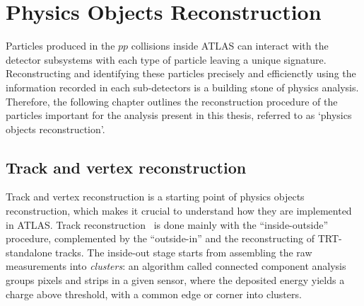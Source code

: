 \chapter{Physics Objects Reconstruction}
\large
Particles produced in the $pp$ collisions inside ATLAS can interact with the detector subsystems
with each type of particle leaving a unique signature.
Reconstructing and identifying these particles precisely and efficienctly 
using the information recorded in each sub-detectors is a building stone of physics analysis.
Therefore, the following chapter outlines the reconstruction procedure of 
the particles important for the analysis present in this thesis, referred to
as `physics objects reconstruction'.
\section{Track and vertex reconstruction}
\label{sec:track}
Track and vertex reconstruction is a starting point of physics objects reconstruction, 
which makes it crucial to understand how they are implemented in ATLAS.
Track reconstruction~\cite{ATLAS-CONF-2012-042,PERF-2015-08} is done 
mainly with the ``inside-outside'' procedure, complemented by the ``outside-in'' 
and the reconstructing of TRT-standalone tracks. 
The inside-out stage starts from assembling the raw measurements
into \textit{clusters}:
an algorithm called connected component analysis~\cite{CCA} 
groups pixels and strips in a given sensor, 
where the deposited energy yields a charge above threshold, 
with a common edge or corner into clusters. 
    
